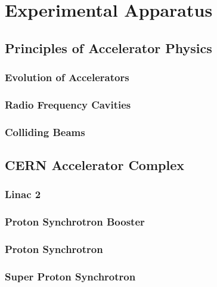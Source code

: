 \chapter{Experimental Apparatus} 

\section{Principles of Accelerator Physics}
\subsection{Evolution of Accelerators}
\subsection{Radio Frequency Cavities}
\subsection{Colliding Beams}

\section{CERN Accelerator Complex}
\subsection{Linac 2}
\subsection{Proton Synchrotron Booster}
\subsection{Proton Synchrotron}
\subsection{Super Proton Synchrotron}

